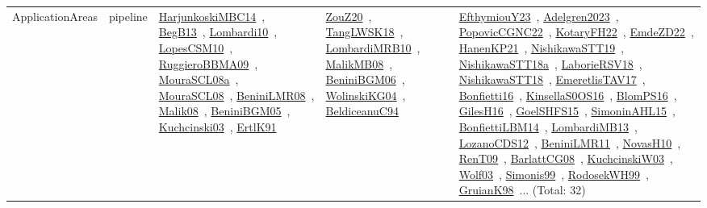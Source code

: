 {\begin{longtable}{lp{3cm}>{\raggedright\arraybackslash}p{6cm}>{\raggedright\arraybackslash}p{6cm}>{\raggedright\arraybackslash}p{8cm}}
ApplicationAreas & pipeline & \href{../works/HarjunkoskiMBC14.pdf}{HarjunkoskiMBC14}~\cite{HarjunkoskiMBC14}, \href{../works/BegB13.pdf}{BegB13}~\cite{BegB13}, \href{../works/Lombardi10.pdf}{Lombardi10}~\cite{Lombardi10}, \href{../works/LopesCSM10.pdf}{LopesCSM10}~\cite{LopesCSM10}, \href{../works/RuggieroBBMA09.pdf}{RuggieroBBMA09}~\cite{RuggieroBBMA09}, \href{../works/MouraSCL08a.pdf}{MouraSCL08a}~\cite{MouraSCL08a}, \href{../works/MouraSCL08.pdf}{MouraSCL08}~\cite{MouraSCL08}, \href{../works/BeniniLMR08.pdf}{BeniniLMR08}~\cite{BeniniLMR08}, \href{../works/Malik08.pdf}{Malik08}~\cite{Malik08}, \href{../works/BeniniBGM05.pdf}{BeniniBGM05}~\cite{BeniniBGM05}, \href{../works/Kuchcinski03.pdf}{Kuchcinski03}~\cite{Kuchcinski03}, \href{../works/ErtlK91.pdf}{ErtlK91}~\cite{ErtlK91} & \href{../works/ZouZ20.pdf}{ZouZ20}~\cite{ZouZ20}, \href{../works/TangLWSK18.pdf}{TangLWSK18}~\cite{TangLWSK18}, \href{../works/LombardiMRB10.pdf}{LombardiMRB10}~\cite{LombardiMRB10}, \href{../works/MalikMB08.pdf}{MalikMB08}~\cite{MalikMB08}, \href{../works/BeniniBGM06.pdf}{BeniniBGM06}~\cite{BeniniBGM06}, \href{../works/WolinskiKG04.pdf}{WolinskiKG04}~\cite{WolinskiKG04}, \href{../works/BeldiceanuC94.pdf}{BeldiceanuC94}~\cite{BeldiceanuC94} & \href{../works/EfthymiouY23.pdf}{EfthymiouY23}~\cite{EfthymiouY23}, \href{../works/Adelgren2023.pdf}{Adelgren2023}~\cite{Adelgren2023}, \href{../works/PopovicCGNC22.pdf}{PopovicCGNC22}~\cite{PopovicCGNC22}, \href{../works/KotaryFH22.pdf}{KotaryFH22}~\cite{KotaryFH22}, \href{../works/EmdeZD22.pdf}{EmdeZD22}~\cite{EmdeZD22}, \href{../works/HanenKP21.pdf}{HanenKP21}~\cite{HanenKP21}, \href{../works/NishikawaSTT19.pdf}{NishikawaSTT19}~\cite{NishikawaSTT19}, \href{../works/NishikawaSTT18a.pdf}{NishikawaSTT18a}~\cite{NishikawaSTT18a}, \href{../works/LaborieRSV18.pdf}{LaborieRSV18}~\cite{LaborieRSV18}, \href{../works/NishikawaSTT18.pdf}{NishikawaSTT18}~\cite{NishikawaSTT18}, \href{../works/EmeretlisTAV17.pdf}{EmeretlisTAV17}~\cite{EmeretlisTAV17}, \href{../works/Bonfietti16.pdf}{Bonfietti16}~\cite{Bonfietti16}, \href{../works/KinsellaS0OS16.pdf}{KinsellaS0OS16}~\cite{KinsellaS0OS16}, \href{../works/BlomPS16.pdf}{BlomPS16}~\cite{BlomPS16}, \href{../works/GilesH16.pdf}{GilesH16}~\cite{GilesH16}, \href{../works/GoelSHFS15.pdf}{GoelSHFS15}~\cite{GoelSHFS15}, \href{../works/SimoninAHL15.pdf}{SimoninAHL15}~\cite{SimoninAHL15}, \href{../works/BonfiettiLBM14.pdf}{BonfiettiLBM14}~\cite{BonfiettiLBM14}, \href{../works/LombardiMB13.pdf}{LombardiMB13}~\cite{LombardiMB13}, \href{../works/LozanoCDS12.pdf}{LozanoCDS12}~\cite{LozanoCDS12}, \href{../works/BeniniLMR11.pdf}{BeniniLMR11}~\cite{BeniniLMR11}, \href{../works/NovasH10.pdf}{NovasH10}~\cite{NovasH10}, \href{../works/RenT09.pdf}{RenT09}~\cite{RenT09}, \href{../works/BarlattCG08.pdf}{BarlattCG08}~\cite{BarlattCG08}, \href{../works/KuchcinskiW03.pdf}{KuchcinskiW03}~\cite{KuchcinskiW03}, \href{../works/Wolf03.pdf}{Wolf03}~\cite{Wolf03}, \href{../works/Simonis99.pdf}{Simonis99}~\cite{Simonis99}, \href{../works/RodosekWH99.pdf}{RodosekWH99}~\cite{RodosekWH99}, \href{../works/GruianK98.pdf}{GruianK98}~\cite{GruianK98}... (Total: 32)\\

\end{longtable}}
